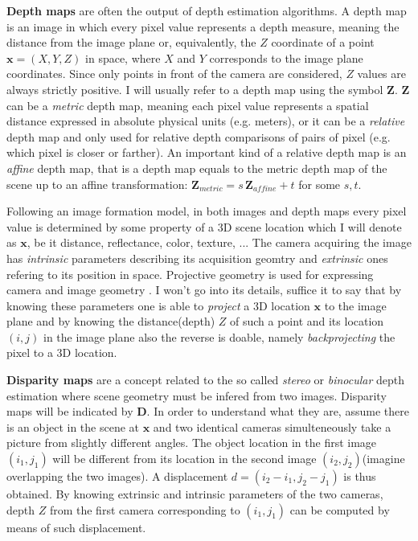 \textbf{Depth maps} are often the output of depth estimation algorithms.
A depth map is an image in which every pixel value represents a depth measure, meaning the distance from the image plane or, equivalently, the $Z$ coordinate of a point $\mathbf{x} = (X, Y, Z)$ in space, where $X$ and $Y$ corresponds to the image plane coordinates.
Since only points in front of the camera are considered, $Z$ values are always strictly positive.
I will usually refer to a depth map using the symbol $\mathbf{Z}$.
$\mathbf{Z}$ can be a \textit{metric} depth map, meaning each pixel value represents a spatial distance expressed in absolute physical units (e.g. meters), or it can be a \textit{relative} depth map and only used for relative depth comparisons of pairs of pixel (e.g. which pixel is closer or farther).
An important kind of a relative depth map is an \textit{affine} depth map, that is a depth map equals to the metric depth map of the scene up to an affine transformation: $\mathbf{Z}_{metric} = s \, \mathbf{Z}_{affine} + t$ for some $s, t$.

Following an image formation model, in both images and depth maps every pixel value is determined by some property of a 3D scene location which I will denote as $\mathbf{x}$, be it distance, reflectance, color, texture, ...
The camera acquiring the image has \textit{intrinsic} parameters describing its acquisition geomtry and \textit{extrinsic} ones refering to its position in space.
Projective geometry is used for expressing camera and image geometry \cite{multiview}.
I won't go into its details, suffice it to say that by knowing these parameters one is able to \textit{project} a 3D location $\mathbf{x}$ to the image plane and by knowing the distance(depth) $Z$ of such a point and its location $(i,j)$ in the image plane also the reverse is doable, namely \textit{backprojecting} the pixel to a 3D location.


\textbf{Disparity maps} are a concept related to the so called \textit{stereo} or \textit{binocular} depth estimation where scene geometry must be infered from two images.
Disparity maps will be indicated by $\mathbf{D}$. In order to understand what they are, assume there is an object in the scene at $\mathbf{x}$ and two identical cameras simulteneously take a picture from slightly different angles.
The object location in the first image $(i_{1}, j_{1})$ will be different from its location in the second image $(i_{2}, j_{2}) $(imagine overlapping the two images).
A displacement $d = (i_{2} - i_{1}, j_{2} - j_{1})$ is thus obtained.
By knowing extrinsic and intrinsic parameters of the two cameras, depth $Z$ from the first camera corresponding to $(i_{1}, j_{1})$ can be computed by means of such displacement.

